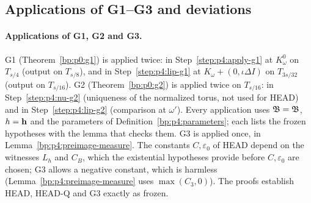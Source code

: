\subsection{Applications of G1--G3 and deviations}\label{bp:p4:sec-notes}

\paragraph{Applications of G1, G2 and G3.} G1 (Theorem~\ref{bp:p0:g1}) is applied twice:
in Step~\ref{step:p4:apply-g1} at $K^0_\omega$ on $T_{s/4}$ (output on $T_{s/8}$), and in
Step~\ref{step:p4:lip-g1} at $K_\omega+(0,\iota\Delta I)$ on $T_{3s/32}$ (output on $T_{s/16}$).
G2 (Theorem~\ref{bp:p0:g2}) is applied twice on $T_{s/16}$: in Step~\ref{step:p4:nu-g2} (uniqueness
of the normalized torus, not used for HEAD) and in Step~\ref{step:p4:lip-g2} (comparison at $\omega'$). Every
application uses $\mathfrak B=\mathfrak{B}$, $h=\mathbf{h}$ and the parameters of
Definition~\ref{bp:p4:parameters}; each lists the frozen hypotheses with the lemma that checks them.
G3 is applied once, in Lemma~\ref{bp:p4:preimage-measure}. The constants $C,\varepsilon_0$ of HEAD depend on the witnesses $L_h$ and $C_B$, which the
existential hypotheses provide before $C,\varepsilon_0$ are chosen; G3 allows a negative constant, which is
harmless (Lemma~\ref{bp:p4:preimage-measure} uses $\max(C_3,0)$). The proofs establish HEAD, HEAD-Q and
G3 exactly as frozen.

